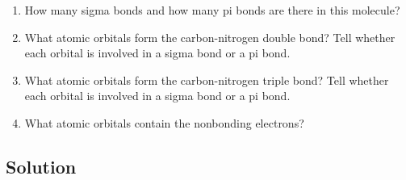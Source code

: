 \documentclass[10pt]{article}
\begin{document}
        \begin{enumerate}[label=\alph*)]
            \item   How many sigma bonds and how many pi bonds are there in this molecule?
            \item   What atomic orbitals form the carbon-nitrogen double bond? Tell whether each orbital is involved in a sigma bond or a pi bond.
            \item   What atomic orbitals form the carbon-nitrogen triple bond? Tell whether each orbital is involved in a sigma bond or a pi bond.
            \item   What atomic orbitals contain the nonbonding electrons?
        \end{enumerate}
        
        \subsection{Solution}

    \pagebreak
    \tableofcontents
\end{document}
